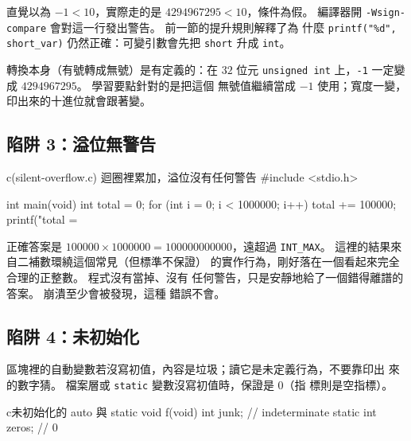 
直覺以為 $-1 < 10$，實際走的是 $4294967295 < 10$，條件為假。 編譯器開
\texttt{-Wsign-compare} 會對這一行發出警告。 前一節的提升規則解釋了為
什麼 \texttt{printf("\%d", short\_var)} 仍然正確：可變引數會先把
\texttt{short} 升成 \texttt{int}。


轉換本身（有號轉成無號）是有定義的：在 $32$ 位元 \texttt{unsigned
int} 上，\texttt{-1} 一定變成 $4294967295$。 學習要點針對的是把這個
無號值繼續當成 $-1$ 使用；寬度一變，印出來的十進位就會跟著變。

\subsection{陷阱 3：溢位無警告}

\begin{example}{c}{(silent-overflow.c) 迴圈裡累加，溢位沒有任何警告}
#include <stdio.h>

int main(void) {
    int total = 0;
    for (int i = 0; i < 1000000; i++) {
        total += 100000;
    }
    printf("total = %
}
\end{example}



正確答案是 $100000 \times 1000000 = 100000000000$，遠超過
\texttt{INT\_MAX}。 這裡的結果來自二補數環繞這個常見（但標準不保證）
的實作行為，剛好落在一個看起來完全合理的正整數。 程式沒有當掉、沒有
任何警告，只是安靜地給了一個錯得離譜的答案。 崩潰至少會被發現，這種
錯誤不會。

\subsection{陷阱 4：未初始化}

區塊裡的自動變數若沒寫初值，內容是垃圾；讀它是未定義行為，不要靠印出
來的數字猜。 檔案層或 \texttt{static} 變數沒寫初值時，保證是 $0$（指
標則是空指標）。

\begin{code}{c}{未初始化的 auto 與 static}
void f(void) {
    int junk;            // indeterminate
    static int zeros;    // 0
}
\end{code}

